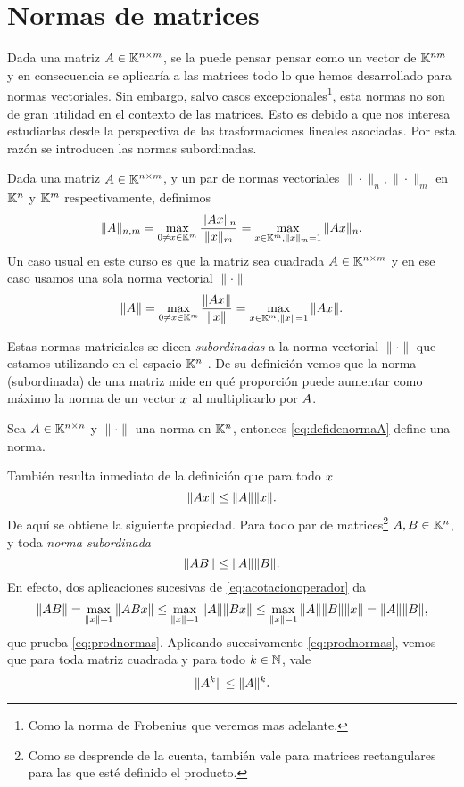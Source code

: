 \section{Normas de matrices}
Dada una matriz $A \in \mathbb K^{n \times m}$, se la puede pensar pensar como un vector de $\mathbb K^{nm}$ y en consecuencia se aplicaría a las matrices todo lo que hemos desarrollado para normas vectoriales.  Sin embargo, salvo casos excepcionales\footnote{Como la norma de Frobenius que veremos mas adelante.}, esta normas no son de gran utilidad en el contexto de las matrices. Esto es debido a que nos interesa estudiarlas desde la perspectiva  de las trasformaciones lineales asociadas. Por esta razón se introducen las normas subordinadas.

Dada una matriz $\Ab \in \K^{n \times m}$, y un par de normas vectoriales $\|\cdot\|_n,\|\cdot\|_m$ en $\mathbb K^n$ y $\mathbb K^m$ respectivamente, definimos
$$
\|\Ab\|_{n,m} = \max_{\cero \neq \xb \in \K^m} \frac{\|\Ab\xb\|_n}{\|\xb\|_m} = \max_{\xb \in \K^m, \|\xb\|_m = 1} \|\Ab\xb\|_n.
$$
Un caso usual en este curso es que la matriz sea cuadrada $\Ab \in \K^{n \times m}$ y en ese caso usamos una sola norma vectorial $\|\cdot\|$
\tccdefi
\begin{equation}
 \label{eq:defidenormaA}
\|\Ab\| = \max_{\cero \neq \xb \in \K^m} \frac{\|\Ab\xb\|}{\|\xb\|} = \max_{\xb \in \K^m, \|\xb\| = 1} \|\Ab\xb\|.
\end{equation}
\etcc

Estas normas matriciales se dicen \emph{subordinadas} a la norma vectorial $\|\cdot\|$ que estamos utilizando
en el espacio $\mathbb K^{n}$ . De su definición vemos que  la norma (subordinada) de una matriz mide en qué proporción puede aumentar como máximo la norma de un vector $\xb$ al multiplicarlo por $\Ab$.

\begin{ej}
Sea $\Ab\in \Knn$ y $\|\cdot\|$ una norma en $\mathbb K^{n}$, entonces
 \eqref{eq:defidenormaA} define una norma.
\end{ej}
También resulta inmediato de la definición que para todo $\xb$
\begin{equation}
 \label{eq:acotacionoperador}
\|\Ab\xb\|\le \|\Ab\|\|\xb\|.
\end{equation}
De aquí se obtiene la siguiente propiedad. Para todo par de matrices\footnote{Como se desprende de la cuenta,  también vale para matrices rectangulares para las que esté definido el producto.} $\Ab, \Bb\in \K^n$, y toda \emph{norma subordinada}
\begin{equation}
 \label{eq:prodnormas}
\|\Ab\Bb\|\le \|\Ab\|\|\Bb\|.
\end{equation}
En efecto,
dos aplicaciones sucesivas de \eqref{eq:acotacionoperador} da
$$
 \|\Ab\Bb\|=\max_{\|\xb\|=1}
\|\Ab\Bb\xb\|\le \max_{\|\xb\|=1}
\|\Ab\|\|\Bb\xb\|\le \max_{\|\xb\|=1}\|\Ab\|\|\Bb\|\|\xb\|=\|\Ab\|\|\Bb\|,$$
que prueba \eqref{eq:prodnormas}.
Aplicando sucesivamente \eqref{eq:prodnormas}, vemos que para toda matriz cuadrada y para todo $k\in\mathbb N$, vale
\begin{equation}
 \label{eq:normasypotencias}
\|\Ab^k\|\le \|\Ab\|^k.
 \end{equation}

